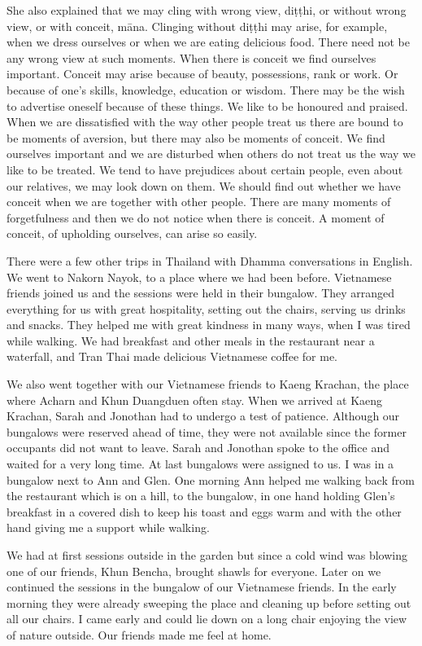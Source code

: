 She also explained that we may cling with wrong view, diṭṭhi, or without
wrong view, or with conceit, māna. Clinging without diṭṭhi may arise,
for example, when we dress ourselves or when we are eating delicious
food. There need not be any wrong view at such moments. When there is
conceit we find ourselves important. Conceit may arise because of
beauty, possessions, rank or work. Or because of one's skills,
knowledge, education or wisdom. There may be the wish to advertise
oneself because of these things. We like to be honoured and praised.
When we are dissatisfied with the way other people treat us there are
bound to be moments of aversion, but there may also be moments of
conceit. We find ourselves important and we are disturbed when others do
not treat us the way we like to be treated. We tend to have prejudices
about certain people, even about our relatives, we may look down on
them. We should find out whether we have conceit when we are together
with other people. There are many moments of forgetfulness and then we
do not notice when there is conceit. A moment of conceit, of upholding
ourselves, can arise so easily.

There were a few other trips in Thailand with Dhamma conversations in
English. We went to Nakorn Nayok, to a place where we had been before.
Vietnamese friends joined us and the sessions were held in their
bungalow. They arranged everything for us with great hospitality,
setting out the chairs, serving us drinks and snacks. They helped me
with great kindness in many ways, when I was tired while walking. We had
breakfast and other meals in the restaurant near a waterfall, and Tran
Thai made delicious Vietnamese coffee for me.

We also went together with our Vietnamese friends to Kaeng Krachan, the
place where Acharn and Khun Duangduen often stay. When we arrived at
Kaeng Krachan, Sarah and Jonothan had to undergo a test of patience.
Although our bungalows were reserved ahead of time, they were not
available since the former occupants did not want to leave. Sarah and
Jonothan spoke to the office and waited for a very long time. At last
bungalows were assigned to us. I was in a bungalow next to Ann and Glen.
One morning Ann helped me walking back from the restaurant which is on a
hill, to the bungalow, in one hand holding Glen's breakfast in a covered
dish to keep his toast and eggs warm and with the other hand giving me a
support while walking.

We had at first sessions outside in the garden but since a cold wind was
blowing one of our friends, Khun Bencha, brought shawls for everyone.
Later on we continued the sessions in the bungalow of our Vietnamese
friends. In the early morning they were already sweeping the place and
cleaning up before setting out all our chairs. I came early and could
lie down on a long chair enjoying the view of nature outside. Our
friends made me feel at home.

